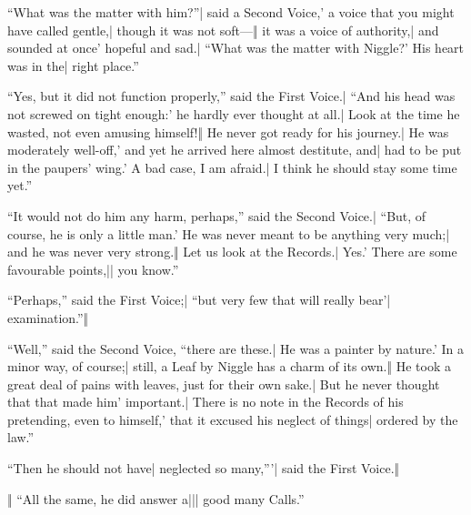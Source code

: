 \begin{itemize}
\halftwo “What was the matter with him?”| said a Second Voice,' a voice that you might have called gentle,| though it was not soft—‖ it was a voice of authority,| and sounded at once' hopeful and sad.| “What was the matter with Niggle?' His heart was in the| right place.”
\end{itemize}

\begin{itemize}
\halfone “Yes, but it did not function properly,” said the First Voice.| “And his head was not screwed on tight enough:' he hardly ever thought at all.| Look at the time he wasted, not even amusing himself!‖ He never got ready for his journey.| He was moderately well-off,' and yet he arrived here almost destitute, and| had to be put in the paupers’ wing.' A bad case, I am afraid.| I think he should stay some time yet.”
\end{itemize}

\begin{itemize}
\halftwo “It would not do him any harm, perhaps,” said the Second Voice.| “But, of course, he is only a little man.' He was never meant to be anything very much;| and he was never very strong.‖ Let us look at the Records.| Yes.' There are some favourable points,|| you know.”
\end{itemize}

\begin{itemize}
\halfone “Perhaps,” said the First Voice;| “but very few that will really bear'| examination.”‖
\end{itemize}

\begin{itemize}
\halftwo “Well,” said the Second Voice, “there are these.| He was a painter by nature.' In a minor way, of course;| still, a Leaf by Niggle has a charm of its own.‖ He took a great deal of pains with leaves, just for their own sake.| But he never thought that that made him' important.| There is no note in the Records of his pretending, even to himself,' that it excused his neglect of things| ordered by the law.”
\end{itemize}

\begin{itemize}
\halfone “Then he should not have| neglected so many,”'| said the First Voice.‖
\end{itemize}

\begin{itemize}
\quarterfour ‖ “All the same, he did answer a||| good many Calls.”
\end{itemize}

